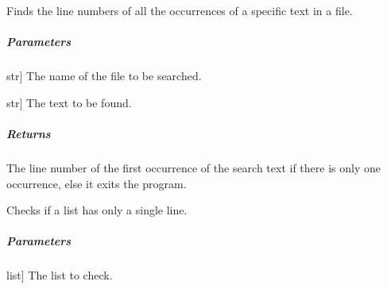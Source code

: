 \documentclass[letterpaper,10pt,english]{sphinxmanual}
\begin{document}
\begin{fulllineitems}
\begin{fulllineitems}
\label{\detokenize{main.doxygen_management:main.doxygen_management.file_handler.FileHandler.find_line_numbers}}
\pysigstartsignatures
{}
\pysigstopsignatures
\sphinxAtStartPar
Finds the line numbers of all the occurrences of a specific text in a file.


\subparagraph{Parameters}
\label{\detokenize{main.doxygen_management:id19}}\begin{description}
\sphinxlineitem{filename}{[}str{]}
\sphinxAtStartPar
The name of the file to be searched.

\sphinxlineitem{searched\_text}{[}str{]}
\sphinxAtStartPar
The text to be found.

\end{description}


\subparagraph{Returns}
\label{\detokenize{main.doxygen_management:id20}}\begin{description}
\sphinxAtStartPar
The line number of the first occurrence of the search text
if there is only one occurrence, else it exits the program.

\end{description}

\end{fulllineitems}


\begin{fulllineitems}
\label{\detokenize{main.doxygen_management:main.doxygen_management.file_handler.FileHandler.has_single_line}}
\pysigstartsignatures
{}
\pysigstopsignatures
\sphinxAtStartPar
Checks if a list has only a single line.


\subparagraph{Parameters}
\label{\detokenize{main.doxygen_management:id21}}\begin{description}
\sphinxlineitem{list}{[}list{]}
\sphinxAtStartPar
The list to check.


\end{description}
\end{fulllineitems}
\end{fulllineitems}
\end{document}
